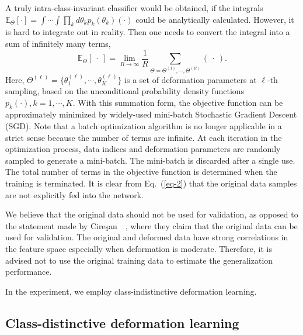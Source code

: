 \documentclass[10pt,twocolumn,letterpaper]{article}
\begin{document}
A truly intra-class-invariant classifier would be obtained, if the integrals
$\mathbb{E}_\Theta [\cdot]  = \int \cdots \int \prod_k d\theta_k p_k(\theta_k) (\cdot)$
could be analytically calculated.
However, it is hard to integrate out in reality.
Then one needs to convert the integral into a sum of infinitely many terms,
\begin{equation}
\mathbb{E}_\Theta [~\cdot~] = 
\lim_{R\rightarrow\infty} \frac{1}{R} \sum_{\Theta = \Theta^{(1)}, \cdots, \Theta^{(R)}} (~\cdot~).
\end{equation}
Here, $\Theta^{(\ell)} = \{ \theta_1^{(\ell)}, \cdots, \theta_K^{(\ell)} \}$ is a set of deformation
parameters at $\ell$-th sampling, based on
the unconditional probability density functions $p_k(\cdot), k=1,\cdots,K$.
With this summation form, the objective function can be approximately minimized 
by widely-used mini-batch Stochastic Gradient Descent (SGD).
Note that a batch optimization algorithm is no longer applicable in a strict sense 
because the number of terms are infinite.
At each iteration in the optimization process, data indices and deformation parameters are randomly 
sampled to generate a mini-batch.
The mini-batch is discarded after a single use.
The total number of terms in the objective function is determined 
when the training is terminated.
It is clear from Eq.~(\ref{eq-2}) that the original data samples are not explicitly fed into the network.

We believe that the original data should not be used for validation,
as opposed to the statement made by Cire{\c s}an~\etal~\cite{Ciresan:2012b, Ciresan:2010},
where they claim that the original data can be used for validation.
The original and deformed data have strong correlations in the feature space 
especially when deformation is moderate.
Therefore, it is advised not to use the original training data to estimate the generalization performance.

In the experiment, we employ class-indistinctive deformation learning.

\subsection{Class-distinctive deformation learning}
\end{document}
